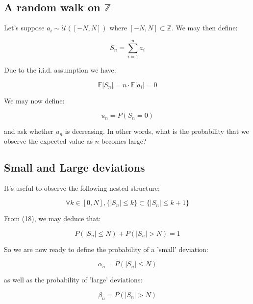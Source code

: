 \documentclass{article}
\begin{document}
\subsection{A random walk on $\mathbb{Z}$}

Let's suppose $a_i \sim \mathcal{U}([-N,N])$ where $[-N,N] \subset \mathbb{Z}$. We may then define:

\begin{equation}
S_n = \sum_{i=1}^n a_i
\end{equation}

Due to the i.i.d. assumption we have:

\begin{equation}
\mathbb{E}\big[S_n\big]= n \cdot \mathbb{E}\big[a_i\big]=0
\end{equation}

We may now define:

\begin{equation}
u_n = P(S_n=0)
\end{equation}

and ask whether $u_n$ is decreasing. In other words, what is the probability that we observe the expected value as $n$ becomes large?

\subsection{Small and Large deviations}

It's useful to observe the following nested structure:

\begin{equation}
\forall k \in [0,N], \{\lvert S_n \rvert \leq k\} \subset \{\lvert S_n \rvert \leq k+1 \}
\end{equation}

From (18), we may deduce that:

\begin{equation}
P(\lvert S_n \rvert \leq N) + P(\lvert S_n \rvert > N) = 1
\end{equation}

So we are now ready to define the probability of a 'small' deviation:

\begin{equation}
	\alpha_n = P(\lvert S_n \rvert \leq N)
\end{equation}

as well as the probability of 'large' deviations:

\begin{equation}
	\beta_n = P(\lvert S_n \rvert > N)
\end{equation}
\end{document}
